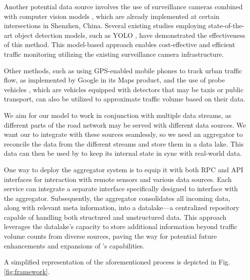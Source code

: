 Another potential data source involves the use of surveillance cameras combined with computer vision models \cite{jain2019review}, which are already implemented at certain intersections in Shenzhen, China. Several existing studies \cite{asha2018vehicle} employing state-of-the-art object detection models, such as YOLO \cite{redmon2018yolov3}, have demonstrated the effectiveness of this method. This model-based approach enables cost-effective and efficient traffic monitoring utilizing the existing surveillance camera infrastructure.


Other methods, such as using GPS-enabled mobile phones \cite{rose2006mobile} to track urban traffic flow, as implemented by Google in its Maps product, and the use of probe vehicles \cite{zhu2012probe}, which are vehicles equipped with detectors that may be taxis or public transport, can also be utilized to approximate traffic volume based on their data.

We aim for our model to work in conjunction with multiple data streams, as different parts of the road network may be served with different data sources. We want our \name to integrate with these sources seamlessly, so we need an aggregator to reconcile the data from the different streams and store them in a data lake. This data can then be used by \name to keep its internal state in sync with real-world data.

One way to deploy the aggregator system is to equip it with both RPC and API interfaces for interaction with remote sensors and various data sources. Each service can integrate a separate interface specifically designed to interface with the aggregator. Subsequently, the aggregator consolidates all incoming data, along with relevant meta information, into a datalake—a centralized repository capable of handling both structured and unstructured data. This approach leverages the datalake's capacity to store additional information beyond traffic volume counts from diverse sources, paving the way for potential future enhancements and expansions of \name's capabilities.

A simplified representation of the aforementioned process is depicted in Fig. \ref{fig:framework}.